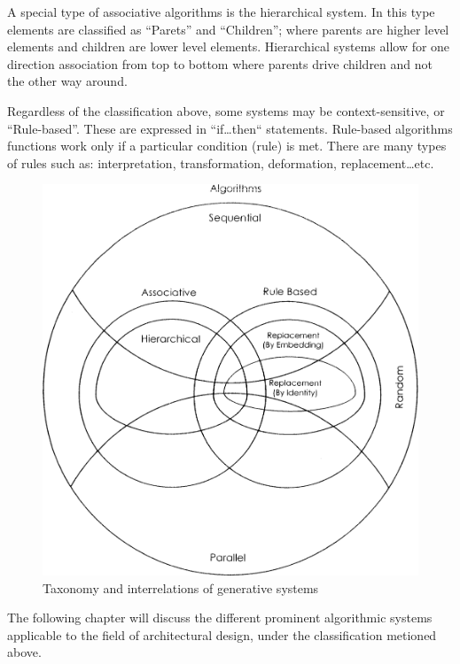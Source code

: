 A special type of associative algorithms is the hierarchical system. In this type elements are classified as ``Parets'' and ``Children''; where parents are higher level elements and children are lower level elements. Hierarchical systems allow for one direction association from top to bottom where parents drive children and not the other way around. \cite{khaldi04}

Regardless of the classification above, some systems may be context-sensitive, or ``Rule-based''. These are expressed in ``if\ldots then`` statements. Rule-based algorithms functions work only if a particular condition (rule) is met. There are many types of rules such as: interpretation, transformation, deformation, replacement\ldots etc. \cite{khaldi04}

\begin{figure}[htbp]
\begin{center}
\includegraphics[width=\textwidth]{./Images/1-Taxonomy}
\end{center}
\caption{Taxonomy and interrelations of generative systems \cite{khaldi04}}
\label{fig:Taxonomy}
\end{figure}

The following chapter will discuss the different prominent algorithmic systems applicable to the field of architectural design, under the classification metioned above.
